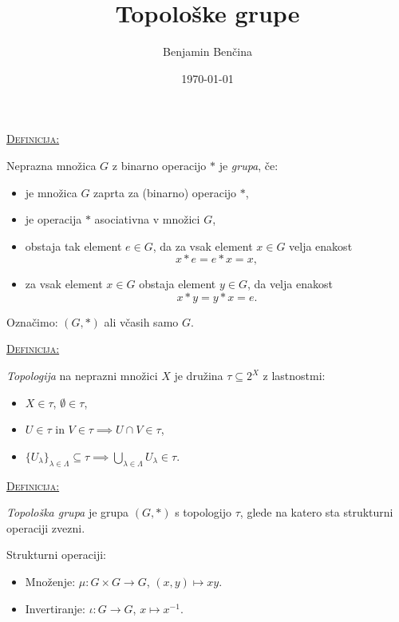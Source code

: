 \documentclass[a4paper, 12pt]{beamer}
\title{Topološke grupe}
\author{Benjamin Benčina}
\institute[FMF]{Fakulteta za matematiko in fiziko}
\date{\today}
\newenvironment{matematika}[1]{
\textcolor{bostonuniversityred}{\underline{\textsc{#1:}}}
}{
}
\begin{document}



\titlepage

\begin{frame}
\begin{matematika}{Definicija}
Neprazna množica $G$ z binarno operacijo $*$ je \emph{grupa}, če:
\begin{itemize}[label=]
\item je množica $G$ zaprta za (binarno) operacijo $*$,
\item je operacija $*$ asociativna v množici $G$,
\item obstaja tak element $e \in G$, da za vsak element $x \in G$ velja enakost 
\[ x*e = e*x = x, \]
\item za vsak element $x \in G$ obstaja element $y \in G$, da velja enakost
\[ x*y = y*x = e. \]
\end{itemize}
Označimo: $(G, *)$ ali včasih samo $G$.
\end{matematika}
\end{frame}

\begin{frame}
\begin{matematika}{Definicija}
\emph{Topologija} na neprazni množici $X$ je družina $\tau \subseteq 2^{X}$ z lastnostmi:
\begin{itemize}[label=]
\item $X \in \tau$, $\emptyset \in \tau$,
\item $U \in \tau$ in $V \in \tau \implies U \cap V \in \tau$,
\item $\lbrace U_{\lambda} \rbrace_{\lambda \in \Lambda} \subseteq \tau \implies \bigcup\limits_{\lambda \in \Lambda}^{} U_{\lambda} \in \tau$.
\end{itemize}
\end{matematika}
\end{frame}

\begin{frame}
\begin{matematika}{Definicija}
\emph{Topološka grupa} je grupa $(G, *)$ s topologijo $\tau$, glede na katero sta strukturni operaciji zvezni.
\end{matematika}
\newline
\newline
Strukturni operaciji:
\begin{itemize}[label=]
\item Množenje: $\mu : G \times G \to G$, $(x, y) \mapsto xy$.
\item Invertiranje: $\iota : G \to G$, $x \mapsto x^{-1}$.
\end{itemize}

\end{frame}
\end{document}
